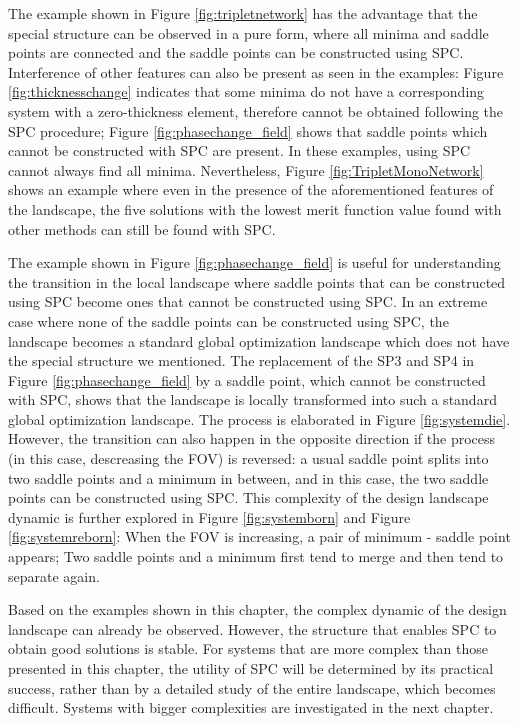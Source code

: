 The example shown in Figure \ref{fig:tripletnetwork} has the advantage that the special structure can be observed in a pure form, where all minima and saddle points are connected and the saddle points can be constructed using SPC. Interference of other features can also be present as seen in the examples: Figure \ref{fig:thicknesschange} indicates that some minima do not have a corresponding system with a zero-thickness element, therefore cannot be obtained following the SPC procedure; Figure \ref{fig:phasechange_field} shows that saddle points which cannot be constructed with SPC are present. In these examples, using SPC cannot always find all minima. Nevertheless, Figure \ref{fig:TripletMonoNetwork} shows an example where even in the presence of the aforementioned features of the landscape, the five solutions with the lowest merit function value found with other methods can still be found with SPC.

The example shown in Figure \ref{fig:phasechange_field} is useful for understanding the transition in the local landscape where saddle points that can be constructed using SPC become ones that cannot be constructed using SPC. In an extreme case where none of the saddle points can be constructed using SPC, the landscape becomes a standard global optimization landscape which does not have the special structure we mentioned. The replacement of the SP3 and SP4 in Figure \ref{fig:phasechange_field} by a saddle point, which cannot be constructed with SPC, shows that the landscape is locally transformed into such a standard global optimization landscape. The process is elaborated in Figure \ref{fig:systemdie}. However, the transition can also happen in the opposite direction if the process (in this case, descreasing the FOV) is reversed: a usual saddle point splits into two saddle points and a minimum in between, and in this case, the two saddle points can be constructed using SPC. This complexity of the design landscape dynamic is further explored in Figure \ref{fig:systemborn} and Figure \ref{fig:systemreborn}: When the FOV is increasing, a pair of minimum - saddle point appears; Two saddle points and a minimum first tend to merge and then tend to separate again. 

Based on the examples shown in this chapter, the complex dynamic of the design landscape can already be observed. However, the structure that enables SPC to obtain good solutions is stable. For systems that are more complex than those presented in this chapter, the utility of SPC will be determined by its practical success, rather than by a detailed study of the entire landscape, which becomes difficult. Systems with bigger complexities are investigated in the next chapter. 

